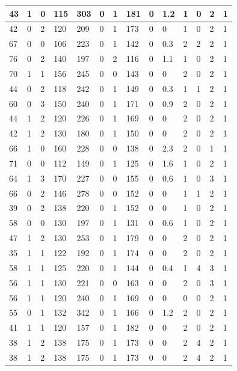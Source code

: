 \documentclass{article}
\begin{document}
\begin{table}[h!]
\begin{tabular}{|l|l|l|l|l|l|l|l|l|l|l|l|l|l|}
43 & 1 & 0 & 115 & 303 & 0 & 1 & 181 & 0 & 1.2 & 1  &0 & 2 & 1 \\ \hline
42 & 0 & 2 & 120 & 209 & 0 & 1 & 173 & 0 & 0 & 1  &0 & 2 & 1 \\ \hline
67 & 0 & 0 & 106 & 223 & 0 & 1 & 142 & 0 & 0.3 & 2  &2 & 2 & 1 \\ \hline
76 & 0 & 2 & 140 & 197 & 0 & 2 & 116 & 0 & 1.1 & 1  &0 & 2 & 1 \\ \hline
70 & 1 & 1 & 156 & 245 & 0 & 0 & 143 & 0 & 0 & 2  &0 & 2 & 1 \\ \hline
44 & 0 & 2 & 118 & 242 & 0 & 1 & 149 & 0 & 0.3 & 1  &1 & 2 & 1 \\ \hline
60 & 0 & 3 & 150 & 240 & 0 & 1 & 171 & 0 & 0.9 & 2  &0 & 2 & 1 \\ \hline
44 & 1 & 2 & 120 & 226 & 0 & 1 & 169 & 0 & 0 & 2  &0 & 2 & 1 \\ \hline
42 & 1 & 2 & 130 & 180 & 0 & 1 & 150 & 0 & 0 & 2  &0 & 2 & 1 \\ \hline
66 & 1 & 0 & 160 & 228 & 0 & 0 & 138 & 0 & 2.3 & 2  &0 & 1 & 1 \\ \hline
71 & 0 & 0 & 112 & 149 & 0 & 1 & 125 & 0 & 1.6 & 1  &0 & 2 & 1 \\ \hline
64 & 1 & 3 & 170 & 227 & 0 & 0 & 155 & 0 & 0.6 & 1  &0 & 3 & 1 \\ \hline
66 & 0 & 2 & 146 & 278 & 0 & 0 & 152 & 0 & 0 & 1  &1 & 2 & 1 \\ \hline
39 & 0 & 2 & 138 & 220 & 0 & 1 & 152 & 0 & 0 & 1  &0 & 2 & 1 \\ \hline
58 & 0 & 0 & 130 & 197 & 0 & 1 & 131 & 0 & 0.6 & 1  &0 & 2 & 1 \\ \hline
47 & 1 & 2 & 130 & 253 & 0 & 1 & 179 & 0 & 0 & 2  &0 & 2 & 1 \\ \hline
35 & 1 & 1 & 122 & 192 & 0 & 1 & 174 & 0 & 0 & 2  &0 & 2 & 1 \\ \hline
58 & 1 & 1 & 125 & 220 & 0 & 1 & 144 & 0 & 0.4 & 1  &4 & 3 & 1 \\ \hline
56 & 1 & 1 & 130 & 221 & 0 & 0 & 163 & 0 & 0 & 2  &0 & 3 & 1 \\ \hline
56 & 1 & 1 & 120 & 240 & 0 & 1 & 169 & 0 & 0 & 0  &0 & 2 & 1 \\ \hline
55 & 0 & 1 & 132 & 342 & 0 & 1 & 166 & 0 & 1.2 & 2  &0 & 2 & 1 \\ \hline
41 & 1 & 1 & 120 & 157 & 0 & 1 & 182 & 0 & 0 & 2  &0 & 2 & 1 \\ \hline
38 & 1 & 2 & 138 & 175 & 0 & 1 & 173 & 0 & 0 & 2  &4 & 2 & 1 \\ \hline
38 & 1 & 2 & 138 & 175 & 0 & 1 & 173 & 0 & 0 & 2  &4 & 2 & 1 \\ \hline

\end{tabular}
\end{table}
\end{document}
